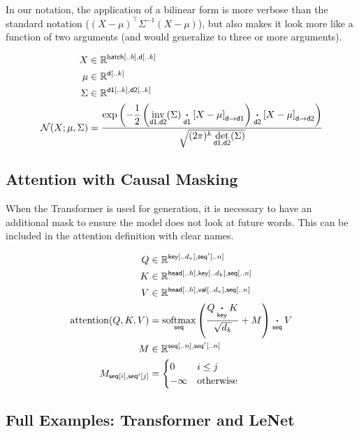 \documentclass{article}
\newcommand{\reals}{\mathbb{R}}
\begin{document}
In our notation, the application of a bilinear form is more verbose than the standard notation ($(X-\mu)^\top \Sigma^{-1} (X-\mu)$), but also makes it look more like a function of two arguments (and would generalize to three or more arguments).

\begin{align*} 
X &\in \reals^{\nset{batch}{..{b}}, \nset{d}{..{k}}}  \\
\mu &\in \reals^{{\nset{d}{..{k}}}}  \\
\Sigma & \in   \reals^{{\nset{d1}{..{k}}, \nset{d2}{..{k}}}}  \\
{\cal N}(X; \mu, \Sigma) &= \frac{\displaystyle \exp\left(-\frac{1}{2}  \left(\nfun{d1, d2}{inv}(\Sigma) \ndot{d1} \nmov{d}{d1}{X - \mu} \right) \ndot{d2} \nmov{d}{d2}{X - \mu} \right)}{\sqrt{(2 \pi)^k \nfun{d1, d2}{det}(\Sigma)}}
\end{align*}


\subsection{Attention with Causal Masking}

When the Transformer is used for generation, it is necessary to have
an additional mask to ensure the model does not look at future words.
This can be included in the attention definition with clear names.

\begin{align*} 
Q &\in \reals^{\nset{key}{..d_v},\nset{seq'}{..n}}\\
K &\in \reals^{\nset{head}{..h},\nset{key}{..d_k}, \nset{seq}{..n}}\\
V &\in \reals^{\nset{head}{..h}, \nset{val}{..d_v}, \nset{seq}{..n}}\\
\text{attention}(Q, K, V) &=  \nfun{seq}{softmax} \left( \frac{Q \ndot{key} K}{\sqrt{d_k}} + M \right) \ndot{seq} V \\
M & \in \reals^{\nset{seq}{..n}, \nset{seq'}{..n}} \\
M_{\nidx{seq}{i}, \nidx{seq'}{j}} & = \begin{cases}0 & i \leq j\\
-\infty & \text{otherwise} \end{cases} \\
\end{align*}


\subsection{Full Examples: Transformer and LeNet}
\end{document}
